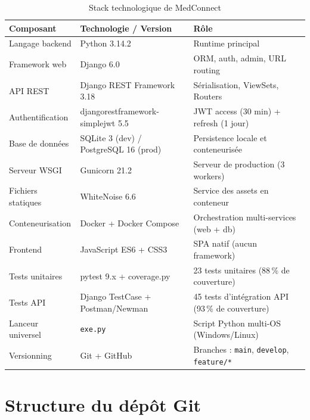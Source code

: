\documentclass[12pt,a4paper]{report}
\begin{document}
\begin{table}[H]
\centering
\caption{Stack technologique de MedConnect}
\renewcommand{\arraystretch}{1.4}
\begin{tabular}{|p{4cm}|p{5cm}|p{5cm}|}
  \hline
  \rowcolor{medaccent}
  \textbf{Composant} & \textbf{Technologie / Version} & \textbf{Rôle} \\
  \hline
  Langage backend & Python 3.14.2 & Runtime principal \\
  \hline
  Framework web & Django 6.0 & ORM, auth, admin, URL routing \\
  \hline
  API REST & Django REST Framework 3.18 & Sérialisation, ViewSets, Routers \\
  \hline
  Authentification & djangorestframework-simplejwt 5.5 & JWT access (30 min) + refresh (1 jour) \\
  \hline
  Base de données & SQLite 3 (dev) / PostgreSQL 16 (prod) & Persistence locale et conteneurisée \\
  \hline
  Serveur WSGI & Gunicorn 21.2 & Serveur de production (3 workers) \\
  \hline
  Fichiers statiques & WhiteNoise 6.6 & Service des assets en conteneur \\
  \hline
  Conteneurisation & Docker + Docker Compose & Orchestration multi-services (web + db) \\
  \hline
  Frontend & JavaScript ES6 + CSS3 & SPA natif (aucun framework) \\
  \hline
  Tests unitaires & pytest 9.x + coverage.py & 23 tests unitaires (88\,\% de couverture) \\
  \hline
  Tests API & Django TestCase + Postman/Newman & 45 tests d'intégration API (93\,\% de couverture) \\
  \hline
  Lanceur universel & \texttt{exe.py} & Script Python multi-OS (Windows/Linux) \\
  \hline
  Versionning & Git + GitHub & Branches : \texttt{main}, \texttt{develop}, \texttt{feature/*} \\
  \hline
\end{tabular}
\end{table}

\section{Structure du dépôt Git}
\end{document}
